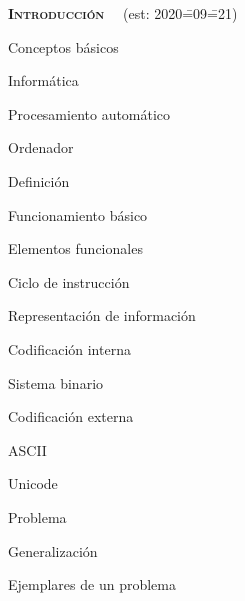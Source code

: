 \begin{longenum}
    \item \textbf{\textsc{Introducción}} \ \ (est: 2020\==09\==21)
    \begin{longenum}
        \item Conceptos básicos
        \begin{longenum}
            \item Informática
            \begin{longenum}
                \item Procesamiento automático
            \end{longenum}
            \item Ordenador
            \begin{longenum}
                \item Definición
                \item Funcionamiento básico
                \begin{longenum}
                    \item Elementos funcionales
                    \item Ciclo de instrucción
                    \item Representación de información
                    \begin{longenum}
                        \item Codificación interna
                        \begin{longenum}
                            \item Sistema binario
                        \end{longenum}
                        \item Codificación externa
                        \begin{longenum}
                            \item ASCII
                            \item Unicode
                        \end{longenum}
                    \end{longenum}
                \end{longenum}
            \end{longenum}
            \item Problema
            \begin{longenum}
                \item Generalización
                \item Ejemplares de un problema

\end{longenum}
\end{longenum}
\end{longenum}
\end{longenum}
